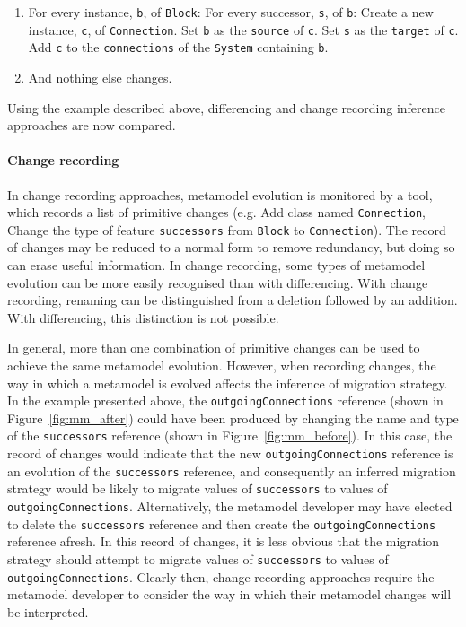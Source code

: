 \begin{enumerate}
	\item For every instance, \texttt{b}, of \texttt{Block}:
		\subitem For every successor, \texttt{s}, of \texttt{b}:
			\subsubitem Create a new instance, \texttt{c}, of \texttt{Connection}.
			\subsubitem Set \texttt{b} as the \texttt{source} of \texttt{c}.
			\subsubitem Set \texttt{s} as the \texttt{target} of \texttt{c}.
			\subsubitem Add \texttt{c} to the \texttt{connections} of the \texttt{System} containing \texttt{b}.
	\item And nothing else changes.
\end{enumerate}

Using the example described above, differencing and change recording inference approaches are now compared. 

\paragraph{Change recording}
In change recording approaches, metamodel evolution is monitored by a tool, which records a list of primitive changes (e.g. Add class named \texttt{Connection}, Change the type of feature \texttt{successors} from \texttt{Block} to \texttt{Connection}). The record of changes may be reduced to a normal form to remove redundancy, but doing so can erase useful information. In change recording, some types of metamodel evolution can be more easily recognised than with differencing. With change recording, renaming can be distinguished from a deletion followed by an addition. With differencing, this distinction is not possible.

In general, more than one combination of primitive changes can be used to achieve the same metamodel evolution. However, when recording changes, the way in which a metamodel is evolved affects the inference of migration strategy. In the example presented above, the \texttt{outgoingConnections} reference (shown in Figure~\ref{fig:mm_after}) could have been produced by changing the name and type of the \texttt{successors} reference (shown in Figure~\ref{fig:mm_before}). In this case, the record of changes would indicate that the new \texttt{outgoingConnections} reference is an evolution of the \texttt{successors} reference, and consequently an inferred migration strategy would be likely to migrate values of \texttt{successors} to values of \texttt{out\-go\-ingCon\-nect\-ions}. Alternatively, the metamodel developer may have elected to delete the \texttt{successors} reference and then create the \texttt{out\-go\-ingCon\-nect\-ions} reference afresh. In this record of changes, it is less obvious that the migration strategy should attempt to migrate values of \texttt{successors} to values of \texttt{out\-go\-ingCon\-nect\-ions}. Clearly then, change recording approaches require the metamodel developer to consider the way in which their metamodel changes will be interpreted.

